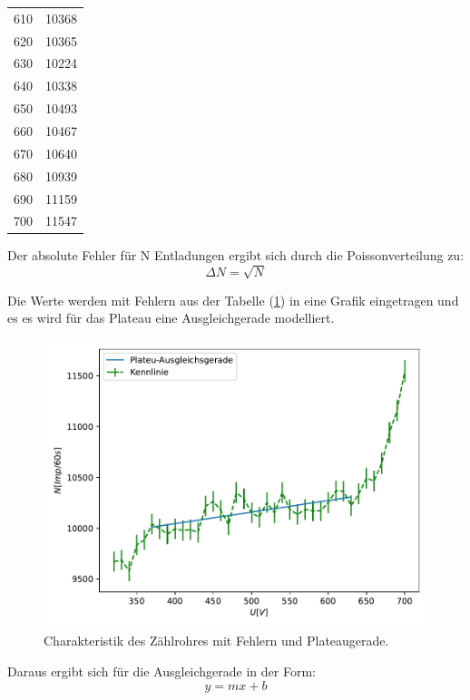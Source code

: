 \begin{table}
\begin{tabular}{c c}
            610 & 	10368 \\
            620 & 	10365 \\
            630 & 	10224 \\
            640 & 	10338 \\
            650 & 	10493 \\
            660 & 	10467 \\
            670 & 	10640 \\
            680 & 	10939 \\
            690 & 	11159 \\
            700 & 	11547 \\
            \bottomrule 
        \end{tabular}
    \label{tab:a}
    \end{table}

    Der absolute Fehler für N Entladungen ergibt sich durch die Poissonverteilung zu:
    \begin{equation}
    \label{eqn:absoluterfehler}
    \Delta N = \sqrt{N}
    \end{equation}

    Die Werte werden mit Fehlern aus der Tabelle (\ref{tab:a}) in eine Grafik eingetragen und es es wird für das Plateau eine Ausgleichgerade modelliert. 
    \begin{figure}
	\centering
	\includegraphics[width=0.8\linewidth]{Daten/a.pdf}
	\caption{Charakteristik des Zählrohres mit Fehlern und Plateaugerade.}
	\label{fig:plateau}
    \end{figure}

    Daraus ergibt sich für die Ausgleichgerade in der Form: 
    \begin{equation*}
    \label{eq:ausgleichsgerade}
    y = mx + b
    \end{equation*}

